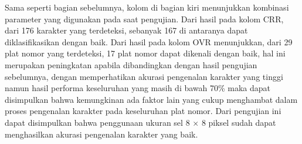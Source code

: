 \noindent Sama seperti bagian sebelumnya, kolom di bagian kiri menunjukkan kombinasi parameter yang digunakan pada saat pengujian. Dari hasil pada kolom CRR, dari 176 karakter yang terdeteksi, sebanyak 167 di antaranya dapat diklasifikasikan dengan baik. Dari hasil pada kolom OVR menunjukkan, dari 29 plat nomor yang terdeteksi, 17 plat nomor dapat dikenali dengan baik, hal ini merupakan peningkatan apabila dibandingkan dengan hasil pengujian sebelumnya, dengan memperhatikan akurasi pengenalan karakter yang tinggi namun hasil performa keseluruhan yang masih di bawah 70\% maka dapat disimpulkan bahwa kemungkinan ada faktor lain yang cukup menghambat dalam proses pengenalan karakter pada keseluruhan plat nomor. Dari pengujian ini dapat  disimpulkan bahwa penggunaan ukuran sel 8 $\times$ 8 piksel sudah dapat menghasilkan akurasi pengenalan karakter yang baik.\\
